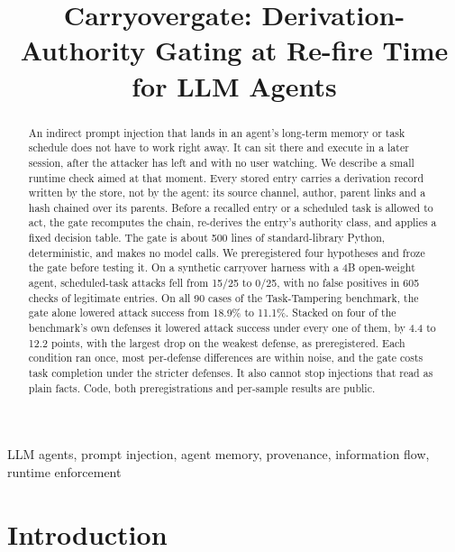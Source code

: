 \documentclass[conference]{IEEEtran}
\begin{document}

\title{Carryovergate: Derivation-Authority Gating at Re-fire Time for LLM Agents}

\author{
}

\maketitle

\begin{abstract}
An indirect prompt injection that lands in an agent's long-term memory or task schedule does
not have to work right away. It can sit there and execute in a later session, after the
attacker has left and with no user watching. We describe a small runtime check aimed at that
moment. Every stored entry carries a derivation record written by the store, not by the agent:
its source channel, author, parent links and a hash chained over its parents. Before a recalled
entry or a scheduled task is allowed to act, the gate recomputes the chain, re-derives the
entry's authority class, and applies a fixed decision table. The gate is about 500 lines of
standard-library Python, deterministic, and makes no model calls. We preregistered four
hypotheses and froze the gate before testing it. On a synthetic carryover harness with a 4B
open-weight agent, scheduled-task attacks fell from 15/25 to 0/25, with no false positives in
605 checks of legitimate entries. On all 90 cases of the Task-Tampering benchmark,
the gate alone lowered attack success from 18.9\% to 11.1\%. Stacked on four of the
benchmark's own defenses it lowered attack success under every one of them, by 4.4 to 12.2
points, with the largest drop on the weakest defense, as preregistered. Each condition ran
once, most per-defense differences are within noise, and the gate costs task completion under
the stricter defenses. It also cannot stop injections that read as plain facts. Code, both
preregistrations and per-sample results are public.
\end{abstract}

\begin{IEEEkeywords}
LLM agents, prompt injection, agent memory, provenance, information flow, runtime enforcement
\end{IEEEkeywords}

\section{Introduction}
\end{document}
